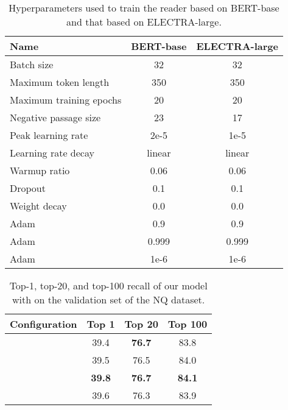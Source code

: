 \documentclass[11pt,a4paper]{article}
\begin{document}
\begin{table}[t]
  \centering
  \small{
  \setlength{\tabcolsep}{2pt}
    \begin{tabular}{l|cc}
      \toprule
      \textbf{Name}                    & \textbf{BERT-base} & \textbf{ELECTRA-large} \\
      \midrule
      Batch size            & 32     & 32  \\
      Maximum token length  & 350    & 350  \\
      Maximum training epochs & 20     & 20 \\
      Negative passage size & 23     & 17  \\
      Peak learning rate    & 2e-5   & 1e-5  \\
      Learning rate decay   & linear & linear\\
      Warmup ratio          & 0.06   & 0.06  \\
      Dropout               & 0.1    & 0.1   \\
      Weight decay          & 0.0    & 0.0   \\
      Adam         & 0.9    & 0.9   \\
      Adam         & 0.999  & 0.999 \\
      Adam        & 1e-6   & 1e-6 \\
      \bottomrule
    \end{tabular}
  }
  \caption{Hyperparameters used to train the reader based on BERT-base and that based on ELECTRA-large.}
  \label{tb:reader-hyper-params}
\end{table}

\begin{table}[t]
  \centering
  \small{
    \begin{tabular}{l|ccc}
      \toprule
      \textbf{Configuration} & \textbf{Top 1} & \textbf{Top 20} & \textbf{Top 100} \\
      \midrule
               & 39.4 & \textbf{76.7} & 83.8 \\
                & 39.5 & 76.5 & 84.0 \\
                 & \textbf{39.8} & \textbf{76.7} & \textbf{84.1} \\
                 & 39.6 & 76.3 & 83.9 \\
      \bottomrule
    \end{tabular}
    \caption{Top-1, top-20, and top-100 recall of our model with  on the validation set of the NQ dataset.}
    \label{tb:experiments-gamma}
  }
\end{table}
\end{document}

